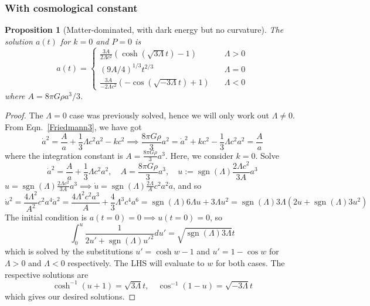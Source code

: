\documentclass[a4paper]{article}
\DeclareMathOperator{\sgn}{sgn}
\theoremstyle{new}
\newtheorem{prop}{Proposition}[section]
\begin{document}
\subsubsection{With cosmological constant}
\begin{prop}[Matter-dominated, with dark energy but no curvature]
The solution $a(t)$ for $k=0$ and $P=0$ is
$$a(t)=\begin{cases}
\frac{3A}{2\Lambda c^2}(\cosh(\sqrt{3\Lambda}t)-1) &\quad \Lambda>0\\
(9A/4)^{1/3}t^{2/3}&\quad \Lambda=0\\
\frac{3A}{-2\Lambda c^2}(-\cos(\sqrt{-3\Lambda}t)+1) &\quad \Lambda<0
\end{cases}$$
where $A=8\pi G\rho a^3/3$.
\end{prop}
\begin{proof}
The $\Lambda=0$ case was previously solved, hence we will only work out $\Lambda\neq 0$. From Eqn.~\ref{Friedmann3}, we have got 
$$\dot{a}^2=\frac{A}{a}+\frac{1}{3}\Lambda c^2a^2-kc^2\implies\frac{8\pi G\rho}{3}a^2=\dot{a}^2+kc^2-\frac{1}{3}\Lambda c^2a^2=\frac{A}{a}$$
where the integration constant is $A=\frac{8\pi G\rho}{3}a^3$. Here, we consider $k=0$. Solve
$$\dot{a}^2=\frac{A}{a}+\frac{1}{3}\Lambda c^2a^2,\quad A=\frac{8\pi G\rho}{3}a^3,\quad u:=\sgn(\Lambda)\frac{2\Lambda c^2}{3A}a^3$$
$u=\sgn(\Lambda)\frac{2\Lambda c^2}{3A}a^3\implies \dot{u}=\sgn(\Lambda)\frac{2\Lambda}{A}c^2a^2\dot{a}$, and so
$$\dot{u}^2=\frac{4\Lambda^2}{A^2}c^2a^4\dot{a}^2=\frac{4\Lambda^2c^2a^3}{A}+\frac{4}{3}\Lambda^3c^4a^6=\sgn(\Lambda)6\Lambda u+3\Lambda u^2=\sgn(\Lambda)3\Lambda(2 u+\sgn(\Lambda)3u^2)$$
The initial condition is $a(t=0)=0\implies u(t=0)=0$, so
$$\int_0^u\frac{1}{2u'+\sgn(\Lambda)u'^2}du'=\sqrt{\sgn(\Lambda)3\Lambda}t$$
which is solved by the substitutions $u'=\cosh w-1$ and $u'=1-\cos w$ for $\Lambda>0$ and $\Lambda<0$ respectively. The LHS will evaluate to $w$ for both cases. The respective solutions are
$$\cosh^{-1}(u+1)=\sqrt{3\Lambda}t,\quad\cos^{-1}(1-u)=\sqrt{-3\Lambda}t$$
which gives our desired solutions.
\end{proof}
\end{document}
